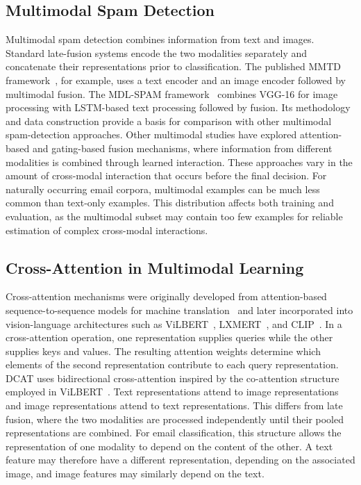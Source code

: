 \documentclass[conference]{IEEEtran}
\begin{document}
\subsection{Multimodal Spam Detection}
Multimodal spam detection combines information from text and images. Standard late-fusion systems encode the two modalities separately and concatenate their representations prior to classification. The published MMTD framework~\cite{ref13}, for example, uses a text encoder and an image encoder followed by multimodal fusion.
The MDL-SPAM framework~\cite{ref2} combines VGG-16 for image processing with LSTM-based text processing followed by fusion. Its methodology and data construction provide a basis for comparison with other multimodal spam-detection approaches.
Other multimodal studies have explored attention-based and gating-based fusion mechanisms, where information from different modalities is combined through learned interaction. These approaches vary in the amount of cross-modal interaction that occurs before the final decision.
For naturally occurring email corpora, multimodal examples can be much less common than text-only examples. This distribution affects both training and evaluation, as the multimodal subset may contain too few examples for reliable estimation of complex cross-modal interactions.
\subsection{Cross-Attention in Multimodal Learning}
Cross-attention mechanisms were originally developed from attention-based sequence-to-sequence models for machine translation~\cite{ref22} and later incorporated into vision-language architectures such as ViLBERT~\cite{ref8}, LXMERT~\cite{ref9}, and CLIP~\cite{ref10}. In a cross-attention operation, one representation supplies queries while the other supplies keys and values. The resulting attention weights determine which elements of the second representation contribute to each query representation.
DCAT uses bidirectional cross-attention inspired by the co-attention structure employed in ViLBERT~\cite{ref8}. Text representations attend to image representations and image representations attend to text representations. This differs from late fusion, where the two modalities are processed independently until their pooled representations are combined.
For email classification, this structure allows the representation of one modality to depend on the content of the other. A text feature may therefore have a different representation, depending on the associated image, and image features may similarly depend on the text.
\end{document}

